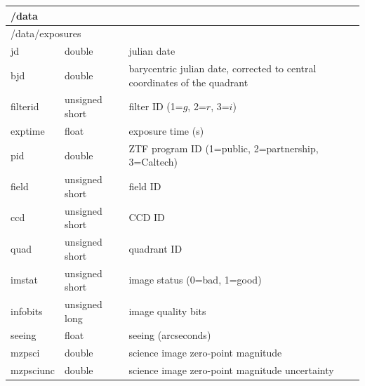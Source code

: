 \documentclass[11pt]{article}
\begin{document}
\vspace{0.5cm}
\begin{table}[ht!]
    \centering
    \footnotesize
    \begin{tabular}{ |p{3.5cm}p{2.5cm}p{9cm}| }
     \hline
     \multicolumn{3}{|l|}{/data} \\
     \hline
     \multicolumn{3}{|l|}{\hspace{0.5cm}/data/exposures} \\
     \hspace{1.0cm}jd          &   double           &   julian date \\
     \hspace{1.0cm}bjd         &   double           &   barycentric julian date, corrected to central coordinates of the quadrant \\
     \hspace{1.0cm}filterid    &   unsigned short   &   filter ID (1=$g$, 2=$r$, 3=$i$) \\
     \hspace{1.0cm}exptime     &   float            &   exposure time (s) \\
     \hspace{1.0cm}pid         &   double           &   ZTF program ID (1=public, 2=partnership, 3=Caltech) \\
     \hspace{1.0cm}field       &   unsigned short   &   field ID \\
     \hspace{1.0cm}ccd         &   unsigned short   &   CCD ID \\
     \hspace{1.0cm}quad        &   unsigned short   &   quadrant ID \\
     \hspace{1.0cm}imstat      &   unsigned short   &   image status (0=bad, 1=good) \\
     \hspace{1.0cm}infobits    &   unsigned long    &   image quality bits \\
     \hspace{1.0cm}seeing      &   float            &   seeing (arcseconds) \\
     \hspace{1.0cm}mzpsci      &   double           &   science image zero-point magnitude \\
     \hspace{1.0cm}mzpsciunc   &   double           &   science image zero-point magnitude uncertainty \\

\end{tabular}
\end{table}
\end{document}
